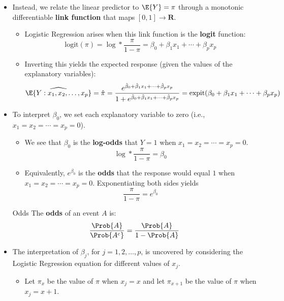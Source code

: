 \begin{itemize}
    \item Instead, we relate the linear predictor to $ \E{Y}=\pi $ through a monotonic differentiable \textbf{link function} that maps $ [0,1]\to\mathbf{R} $.
          \begin{itemize}
              \item Logistic Regression arises when this link function is the \textbf{logit} function:
                    \[ \text{logit}(\pi)=\log*{\frac{\pi}{1-\pi}}=\beta_0+\beta_1x_1+\cdots+\beta_p x_p \]
              \item Inverting this yields the expected response (given the values of the explanatory variables):
                    \[ \widehat{\E{Y\given x_1,x_2,\ldots,x_p}}=\hat{\pi}=\frac{e^{\hat{\beta}_0+\hat{\beta}_1 x_1+\cdots+\hat{\beta}_p x_p}}{1+e^{\hat{\beta}_0+\hat{\beta}_1 x_1+\cdots+\hat{\beta}_p x_p}}
                        =\text{expit}(\beta_0+\beta_1x_1+\cdots+\beta_p x_p)  \]
          \end{itemize}
    \item To interpret $ \beta_0 $, we set each explanatory variable to zero (i.e., $ x_1=x_2=\cdots=x_p=0 $).
          \begin{itemize}
              \item We see that $ \beta_0 $ is the \textbf{log-odds} that $ Y=1 $ when $ x_1=x_2=\cdots=x_p=0 $.
                    \[ \log*{\frac{\pi}{1-\pi}}=\beta_0 \]
              \item Equivalently, $ e^{\beta_0} $ is the \textbf{odds} that the response would equal $ 1 $ when $ x_1=x_2=\cdots=x_p=0 $.
                    Exponentiating both sides yields
                    \[ \frac{\pi}{1-\pi}=e^{\beta_0}  \]
          \end{itemize}
          \begin{Definition}{Odds}{}
              The \textbf{odds} of an event $ A $ is:
              \[ \frac{\Prob{A}}{\Prob{A^c}}=\frac{\Prob{A}}{1-\Prob{A}} \]
          \end{Definition}
    \item The interpretation of $\beta_j$, for $ j=1,2,\ldots,p $, is uncovered by considering the Logistic Regression equation
          for different values of $ x_j $.
          \begin{itemize}
              \item Let $ \pi_x $ be the value of $ \pi $ when $ x_j=x $ and let $ \pi_{x+1} $ be the value of $ \pi $ when $ x_j=x+1 $.
                    \begin{align*}

\end{align*}
\end{itemize}
\end{itemize}
